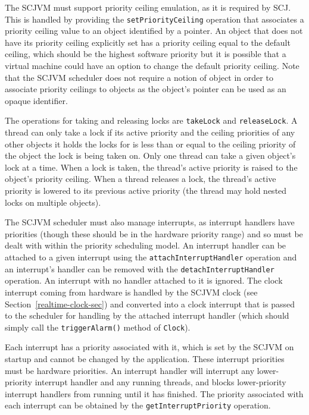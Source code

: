 \documentclass[a4paper,10pt]{article}
\begin{document}
The SCJVM must support priority ceiling emulation, as it is required by
SCJ. This is handled by providing the \texttt{set\-Priority\-Ceiling} operation
that associates a priority ceiling value to an object identified by a
pointer. An object that does not have its priority ceiling explicitly set has a
priority ceiling equal to the default ceiling, which should be the highest
software priority but it is possible that a virtual machine could have an option
to change the default priority ceiling. Note that the SCJVM scheduler does not
require a notion of object in order to associate priority ceilings to objects as
the object's pointer can be used as an opaque identifier.

The operations for taking and releasing locks are \texttt{takeLock} and
\texttt{releaseLock}. A thread can only take a lock if its active priority and
the ceiling priorities of any other objects it holds the locks for is less than
or equal to the ceiling priority of the object the lock is being taken on. Only
one thread can take a given object's lock at a time. When a lock is taken, the
thread's active priority is raised to the object's priority ceiling. When a
thread releases a lock, the thread's active priority is lowered to its previous
active priority (the thread may hold nested locks on multiple objects).

The SCJVM scheduler must also manage interrupts, as interrupt handlers have
priorities (though these should be in the hardware priority range) and so must
be dealt with within the priority scheduling model. An interrupt handler can be
attached to a given interrupt using the \texttt{attach\-Interrupt\-Handler}
operation and an interrupt's handler can be removed with the
\texttt{detach\-Interrupt\-Handler} operation. An interrupt with no handler
attached to it is ignored. The clock interrupt coming from hardware is handled
by the SCJVM clock (see Section~\ref{realtime-clock-sec}) and converted into a
clock interrupt that is passed to the scheduler for handling by the attached
interrupt handler (which should simply call the \texttt{triggerAlarm()} method
of \texttt{Clock}).

Each interrupt has a priority associated with it, which is set by the SCJVM on
startup and cannot be changed by the application. These interrupt priorities
must be hardware priorities. An interrupt handler will interrupt any
lower-priority interrupt handler and any running threads, and blocks
lower-priority interrupt handlers from running until it has finished. The
priority associated with each interrupt can be obtained by the
\texttt{get\-Interrupt\-Priority} operation.
\end{document}
